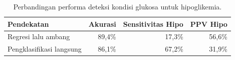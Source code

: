 \begin{table}[!htbp]
    \centering
    \caption{Perbandingan performa deteksi kondisi glukosa untuk hipoglikemia.}
    \label{tab:tab6.8_perbandingan_deteksi_hipoglikemia}
    \begin{tabular}{lrrr}
        \hline
        \textbf{Pendekatan} & \textbf{Akurasi} & \textbf{Sensitivitas Hipo} & \textbf{PPV Hipo} \\
        \hline
        Regresi lalu ambang & 89,4\% & 17,3\% & 56,6\% \\
        Pengklasifikasi langsung & 86,1\% & 67,2\% & 31,9\% \\
        \hline
    \end{tabular}
\end{table}
